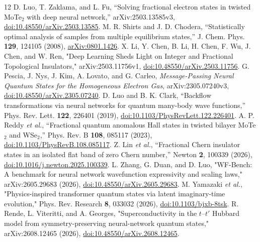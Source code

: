 \documentclass[10pt,twocolumn]{article}
\begin{document}

\begin{thebibliography}{12}
 D. Luo, T. Zaklama, and L. Fu, ``Solving fractional electron states in twisted MoTe$_2$ with deep neural network,'' arXiv:2503.13585v3, \href{https://doi.org/10.48550/arXiv.2503.13585}{doi:10.48550/arXiv.2503.13585}.
 M. R. Shirts and J. D. Chodera, ``Statistically optimal analysis of samples from multiple equilibrium states,'' J. Chem. Phys. \textbf{129}, 124105 (2008), \href{https://arxiv.org/abs/0801.1426}{arXiv:0801.1426}.
 X. Li, Y. Chen, B. Li, H. Chen, F. Wu, J. Chen, and W. Ren,
"Deep Learning Sheds Light on Integer and Fractional Topological Insulators,"
arXiv:2503.11756v1,
\href{https://doi.org/10.48550/arXiv.2503.11756}{doi:10.48550/arXiv.2503.11756}.
 G. Pescia, J. Nys, J. Kim, A. Lovato, and G. Carleo, \emph{Message-Passing Neural Quantum States for the Homogeneous Electron Gas}, arXiv:2305.07240v3, \href{https://doi.org/10.48550/arXiv.2305.07240}{doi:10.48550/arXiv.2305.07240}.
 D. Luo and B. K. Clark, ``Backflow transformations via neural networks for quantum many-body wave functions,'' Phys. Rev. Lett. \textbf{122}, 226401 (2019), \href{https://doi.org/10.1103/PhysRevLett.122.226401}{doi:10.1103/PhysRevLett.122.226401}.
 A. P. Reddy \emph{et al.}, ``Fractional quantum anomalous Hall states in twisted bilayer MoTe$_2$ and WSe$_2$,'' Phys. Rev. B \textbf{108}, 085117 (2023), \href{https://doi.org/10.1103/PhysRevB.108.085117}{doi:10.1103/PhysRevB.108.085117}.
 Z. Lin \emph{et al.}, ``Fractional Chern insulator states in an isolated flat band of zero Chern number,'' Newton \textbf{2}, 100339 (2026), \href{https://doi.org/10.1016/j.newton.2025.100339}{doi:10.1016/j.newton.2025.100339}.
 L. Zhang, G. Duan, and D. Luo, "WF-Bench: A benchmark for neural network wavefunction expressivity and scaling laws," arXiv:2605.29683 (2026), \href{https://doi.org/10.48550/arXiv.2605.29683}{doi:10.48550/arXiv.2605.29683}.
 M. Yamazaki \emph{et al.}, "Physics-inspired transformer quantum states via latent imaginary-time evolution," Phys. Rev. Research \textbf{8}, 033032 (2026), \href{https://doi.org/10.1103/bjxb-8tsk}{doi:10.1103/bjxb-8tsk}.
 R. Rende, L. Viteritti, and A. Georges, "Superconductivity in the $t$--$t'$ Hubbard model from symmetry-preserving neural-network quantum states," arXiv:2608.12465 (2026), \href{https://doi.org/10.48550/arXiv.2608.12465}{doi:10.48550/arXiv.2608.12465}.
\end{thebibliography}
\end{document}
